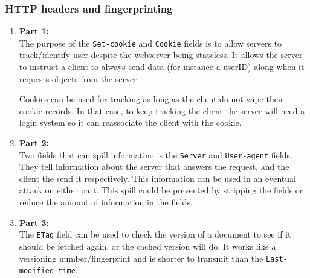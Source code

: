 \documentclass[10pt]{article}
\begin{document}
\subsubsection{HTTP headers and fingerprinting}
\begin{enumerate}
    \item \textbf{Part 1:}\\
    The purpose of the \texttt{Set-cookie} and \texttt{Cookie} fields is to
    allow servers to track/identify user despite the webserver being stateless.
    It allows the server to instruct a client to always send data (for instance
    a userID) along when it requests objects from the server.

    Cookies can be used for tracking as long as the client do not wipe their
    cookie records. In that case, to keep tracking the client the server will
    need a login system so it can reassociate the client with the cookie.

    \item \textbf{Part 2:}\\
    Two fields that can spill informatino is the \texttt{Server} and
    \texttt{User-agent} fields. They tell information about the server that
    answers the request, and the client the send it respectively. This
    information can be used in an eventual attack on either part. This spill
    could be prevented by stripping the fields or reduce the amount of
    information in the fields.

    \item \textbf{Part 3:}\\

    The \texttt{ETag} field can be used to check the version of a document to
    see if it should be fetched again, or the cached version will do. It works
    like a versioning number/fingerprint and is shorter to transmit than the
    \texttt{Last-modified-time}.

\end{enumerate}
\end{document}
